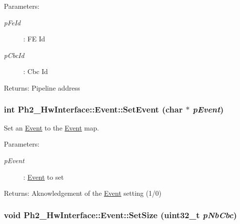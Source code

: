 \begin{Desc}
\item[Parameters:]
\begin{description}
\item[{\em p\-Fe\-Id}]: FE Id \item[{\em p\-Cbc\-Id}]: Cbc Id \end{description}
\end{Desc}
\begin{Desc}
\item[Returns:]Pipeline address \end{Desc}
\hypertarget{class_ph2___hw_interface_1_1_event_67bf8cfaeaec158907932be40b37601d}{
\subsubsection[SetEvent]{\setlength{\rightskip}{0pt plus 5cm}int Ph2\_\-Hw\-Interface::Event::Set\-Event (char $\ast$ {\em p\-Event})}}
\label{class_ph2___hw_interface_1_1_event_67bf8cfaeaec158907932be40b37601d}


Set an \hyperlink{class_ph2___hw_interface_1_1_event}{Event} to the \hyperlink{class_ph2___hw_interface_1_1_event}{Event} map. 

\begin{Desc}
\item[Parameters:]
\begin{description}
\item[{\em p\-Event}]: \hyperlink{class_ph2___hw_interface_1_1_event}{Event} to set \end{description}
\end{Desc}
\begin{Desc}
\item[Returns:]Aknowledgement of the \hyperlink{class_ph2___hw_interface_1_1_event}{Event} setting (1/0) \end{Desc}
\hypertarget{class_ph2___hw_interface_1_1_event_2a9e8d866e4d8c4fe91ea8320b931047}{
\subsubsection[SetSize]{\setlength{\rightskip}{0pt plus 5cm}void Ph2\_\-Hw\-Interface::Event::Set\-Size (uint32\_\-t {\em p\-Nb\-Cbc})}}
\label{class_ph2___hw_interface_1_1_event_2a9e8d866e4d8c4fe91ea8320b931047}


